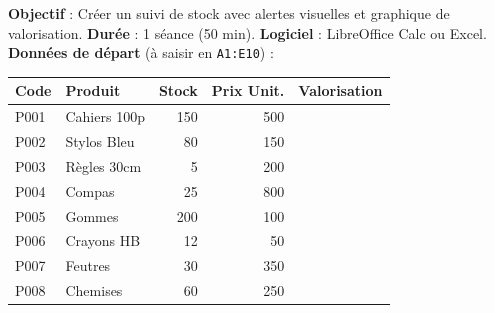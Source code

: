 \documentclass[11pt]{article}
\begin{document}
\begin{experience}
\textbf{Objectif} : Créer un suivi de stock avec alertes visuelles et graphique de valorisation.
\textbf{Durée} : 1 séance (50 min).
\textbf{Logiciel} : LibreOffice Calc ou Excel.
\textbf{Données de départ} (à saisir en \texttt{A1:E10}) :
\begin{center}
\begin{tabular}{|l|l|r|r|r|}\hline
\textbf{Code} & \textbf{Produit} & \textbf{Stock} & \textbf{Prix Unit.} & \textbf{Valorisation} \\ \hline
P001 & Cahiers 100p & 150 & 500 & \\ \hline
P002 & Stylos Bleu & 80 & 150 & \\ \hline
P003 & Règles 30cm & 5 & 200 & \\ \hline
P004 & Compas & 25 & 800 & \\ \hline
P005 & Gommes & 200 & 100 & \\ \hline
P006 & Crayons HB & 12 & 50 & \\ \hline
P007 & Feutres & 30 & 350 & \\ \hline
P008 & Chemises & 60 & 250 & \\ \hline
\end{tabular}
\end{center}


\end{experience}
\end{document}
